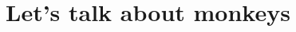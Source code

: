 \documentclass[1-ambra-tesi.tex]{subfiles}
\begin{document}
\label{sec:chapter2}

\begin{chapabstract}
\small{\lipsum[1]}\\

\begin{center}
    \noindent\makebox[0.8\linewidth]{\rule{0.8\paperwidth}{0.4pt}}
\end{center}
\vspace{2cm}
\end{chapabstract}


\lipsum[2]

\section{Let's talk about monkeys}
\label{sec:monkeys}
\lipsum[3]
\end{document}

